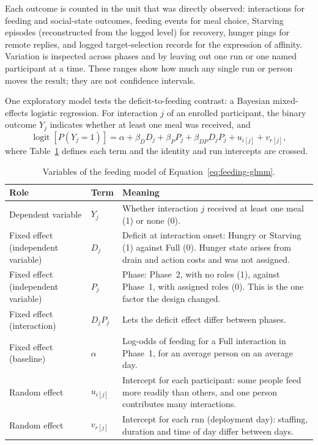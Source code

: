 Each outcome is counted in the unit that was directly observed: interactions for feeding and social-state outcomes, feeding events for meal choice, Starving episodes (reconstructed from the logged level) for recovery, hunger pings for remote replies, and logged target-selection records for the expression of affinity. Variation is inspected across phases and by leaving out one run or one named participant at a time. These ranges show how much any single run or person moves the result; they are not confidence intervals.

One exploratory model tests the deficit-to-feeding contrast: a Bayesian mixed-effects logistic regression. For interaction $j$ of an enrolled participant, the binary outcome $Y_j$ indicates whether at least one meal was received, and
\begin{equation}
\operatorname{logit}\!\left[P(Y_j=1)\right]
= \alpha + \beta_D D_j + \beta_P P_j + \beta_{DP}D_jP_j + u_{i[j]} + v_{r[j]},
\label{eq:feeding-glmm}
\end{equation}
where Table~\ref{tab:glmm-roles} defines each term and the identity and run intercepts are crossed.

\begin{table}[tbp]
    \centering
    \small
    \caption{Variables of the feeding model of Equation~\ref{eq:feeding-glmm}.}
    \label{tab:glmm-roles}
    \begin{tabular}{@{}>{\raggedright\arraybackslash}p{}>{\raggedright\arraybackslash}p{}>{\raggedright\arraybackslash}p{}@{}}
        \toprule
        \textbf{Role} & \textbf{Term} & \textbf{Meaning} \\
        \midrule
        Dependent variable & $Y_j$ & Whether interaction $j$ received at least one meal (1) or none (0). \\
        Fixed effect (independent variable) & $D_j$ & Deficit at interaction onset: Hungry or Starving (1) against Full (0). Hunger state arises from drain and action costs and was not assigned. \\
        Fixed effect (independent variable) & $P_j$ & Phase: Phase~2, with no roles (1), against Phase~1, with assigned roles (0). This is the one factor the design changed. \\
        Fixed effect (interaction) & $D_jP_j$ & Lets the deficit effect differ between phases. \\
        Fixed effect (baseline) & $\alpha$ & Log-odds of feeding for a Full interaction in Phase~1, for an average person on an average day. \\
        Random effect & $u_{i[j]}$ & Intercept for each participant: some people feed more readily than others, and one person contributes many interactions. \\
        Random effect & $v_{r[j]}$ & Intercept for each run (deployment day): staffing, duration and time of day differ between days. \\
        \bottomrule
    \end{tabular}
\end{table}


